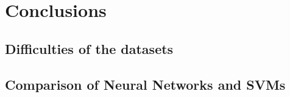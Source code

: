 
\section{Conclusions}

\subsection{Difficulties of the datasets}

\subsection{Comparison of Neural Networks and SVMs}